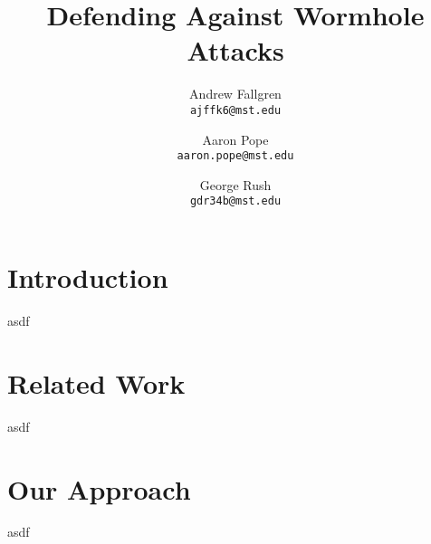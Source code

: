 \documentclass[12pt,a4paper]{report}
\author{
    Andrew Fallgren \\
    \texttt{ajffk6@mst.edu}
    \and
    Aaron Pope \\
    \texttt{aaron.pope@mst.edu}
    \and
    George Rush \\
    \texttt{gdr34b@mst.edu}
}
\title{Defending Against Wormhole Attacks}
\begin{document}
\maketitle

\pagebreak
\section{Introduction}
asdf

\pagebreak
\section{Related Work}
asdf

\pagebreak
\section{Our Approach}
asdf



\end{document}
